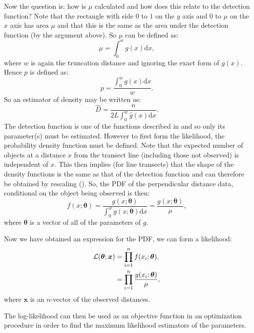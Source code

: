 Now the question is: how is $\mu$ calculated and how does this relate to the detection function? Note that the rectangle with side $0$ to $1$ on the $y$ axis and $0$ to $\mu$ on the $x$ axis has area $\mu$ and that this is the same as the area under the detection function (by the argument above). So $\mu$ can be defined as:
\begin{equation}
\mu = \int_0^w g(x) \text{d}x,
\label{ds-lt-mu-def}
\end{equation}
where $w$ is again the truncation distance and ignoring the exact form of $g(x)$. Hence $p$ is defined as:
\begin{equation*}
p = \frac{\int_0^w g(x) \text{d}x}{w}.
\end{equation*}
So an estimator of density may be written as:
\begin{equation*}
\hat{D}=\frac{n}{2L \int_0^w \hat{g}(x) \text{d}x}.
\end{equation*}
The detection function is one of the functions described in  and so only its parameter(s) must be estimated. However to first form the likelihood, the probability density function must be defined. Note that the expected number of objects at a distance $x$ from the transect line (including those not observed) is independent of $x$. This then implies (for line transects) that the shape of the density functions is the same as that of the detection function and can therefore be obtained by rescaling (\cite[p. 38]{IDS}). So, the PDF of the perpendicular distance data, conditional on the object being observed is then:
\begin{equation*}
f(x;\bm{\theta}) = \frac{g(x;\bm{\theta})}{\int_0^w g(x;\bm{\theta}) \text{d}x} = \frac{g(x;\bm{\theta})}{\mu},
\end{equation*}
where $\bm{\theta}$ is a vector of all of the parameters of $g$.

Now we have obtained an expression for the PDF, we can form a likelihood:
\begin{align}
\mathcal{L}(\bm{\theta}; \bm{x}) &= \prod_{i=1}^n f(x_i;\bm{\theta}),\notag \\
&= \prod_{i=1}^n \frac{g(x_i;\bm{\theta})}{\mu},
\label{ds-lt-likelihood}
\end{align}\label{cor-7s7}
where $\bm{x}$ is an $n$-vector of the observed distances.

The log-likelihood can then be used as an objective function in an optimization procedure in order to find the maximum likelihood estimators of the parameters.

